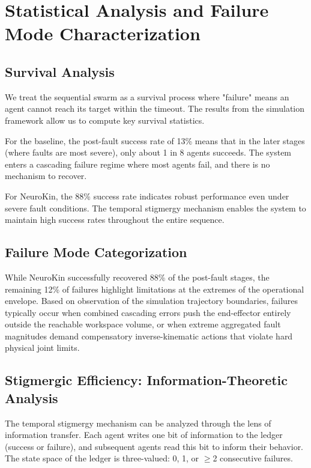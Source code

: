 \documentclass[12pt,a4paper,oneside]{report}
\begin{document}
\section{Statistical Analysis and Failure Mode Characterization}

\subsection{Survival Analysis}
\label{subsec:survival_analysis}

We treat the sequential swarm as a survival process where "failure" means an agent cannot reach its target within the timeout. The results from the simulation framework allow us to compute key survival statistics.

For the baseline, the post-fault success rate of 13\% means that in the later stages (where faults are most severe), only about 1 in 8 agents succeeds. The system enters a cascading failure regime where most agents fail, and there is no mechanism to recover.

For NeuroKin, the 88\% success rate indicates robust performance even under severe fault conditions. The temporal stigmergy mechanism enables the system to maintain high success rates throughout the entire sequence.

\subsection{Failure Mode Categorization}
\label{subsec:failure_mode_categorization}

While NeuroKin successfully recovered 88\% of the post-fault stages, the remaining 12\% of failures highlight limitations at the extremes of the operational envelope. Based on observation of the simulation trajectory boundaries, failures typically occur when combined cascading errors push the end-effector entirely outside the reachable workspace volume, or when extreme aggregated fault magnitudes demand compensatory inverse-kinematic actions that violate hard physical joint limits.

\subsection{Stigmergic Efficiency: Information-Theoretic Analysis}
\label{subsec:stigmergic_efficiency_information_theoretic_analysis}

The temporal stigmergy mechanism can be analyzed through the lens of information transfer. Each agent writes one bit of information to the ledger (success or failure), and subsequent agents read this bit to inform their behavior. The state space of the ledger is three-valued: 0, 1, or $\geq$2 consecutive failures.
\end{document}
